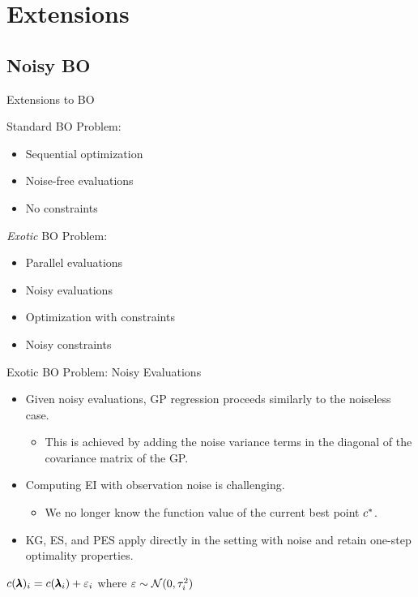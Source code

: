 \section{Extensions}
\subsection{Noisy BO}
\begin{frame}{Extensions to BO}
\begin{block}{Standard BO Problem:}
\begin{itemize}
    \item Sequential optimization
    \pause
    \item Noise-free evaluations
    \item No constraints
\end{itemize}
\end{block}
\begin{block}{\emph{Exotic} BO Problem:}
\begin{itemize}
    \item Parallel evaluations
    \item Noisy evaluations
    \item Optimization with constraints
    \item Noisy constraints
\end{itemize}
\end{block}    
\end{frame}

\begin{frame}{Exotic BO Problem: Noisy Evaluations}
    \begin{itemize}
        \item Given noisy evaluations, GP regression proceeds similarly to the noiseless case.
        \begin{itemize}
            \item This is achieved by adding the noise variance terms in the diagonal of the covariance matrix of the GP.
        \end{itemize}
        \item Computing EI with observation noise is challenging.
        \begin{itemize}
            \item We no longer know the function value of the current best point $c^{*}$.
        \end{itemize}
        \item KG, ES, and PES apply directly in the setting with noise and retain one-step optimality properties.
        \end{itemize}
        \vspace{5mm}
        \center $c({\pmb{\lambda}})_i=c(\pmb{\lambda}_i)+\varepsilon_i$ where $\varepsilon\sim\mathcal{N}(0,\tau_{i}^2)$
\end{frame}

